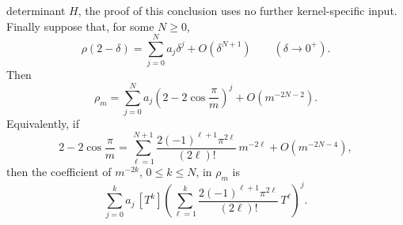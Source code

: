 \begin{theorem}
  determinant \(H\), the proof of this conclusion uses no further
  kernel-specific input.
  Finally suppose that, for some \(N\ge0\),
  \[
    \rho(2-\delta)=\sum_{j=0}^N a_j\delta^j+O(\delta^{N+1})
    \qquad(\delta\to0^+).
  \]
  Then
  \[
    \rho_m
    =\sum_{j=0}^N a_j
      \left(2-2\cos\frac{\pi}{m}\right)^j
      +O(m^{-2N-2}).
  \]
  Equivalently, if
  \[
    2-2\cos\frac{\pi}{m}
      =\sum_{\ell=1}^{N+1}
        \frac{2(-1)^{\ell+1}\pi^{2\ell}}{(2\ell)!}\,m^{-2\ell}
        +O(m^{-2N-4}),
  \]
  then the coefficient of \(m^{-2k}\), \(0\le k\le N\), in \(\rho_m\)
  is
  \[
    \sum_{j=0}^k a_j\,
    [T^k]\left(
      \sum_{\ell=1}^k
        \frac{2(-1)^{\ell+1}\pi^{2\ell}}{(2\ell)!}\,T^\ell
    \right)^j .
  \]

\end{theorem}

